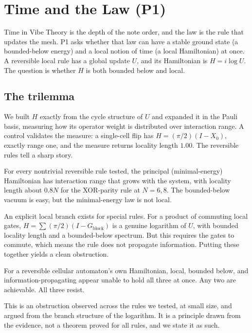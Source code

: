 \section{Time and the Law (P1)}
\label{sec:law}

Time in Vibe Theory is the depth of the note order, and the law is the rule that updates the mesh. P1 asks whether that law can have a stable ground state (a bounded-below energy) and a local notion of time (a local Hamiltonian) at once. A reversible local rule has a global update $U$, and its Hamiltonian is $H = i \log U$. The question is whether $H$ is both bounded below and local.

\subsection{The trilemma}

We built $H$ exactly from the cycle structure of $U$ and expanded it in the Pauli basis, measuring how its operator weight is distributed over interaction range. A control validates the measure: a single-cell flip has $H = (\pi/2)(I - X_0)$, exactly range one, and the measure returns locality length $1.00$. The reversible rules tell a sharp story.

\begin{result}
For every nontrivial reversible rule tested, the principal (minimal-energy) Hamiltonian has interaction range that grows with the system, with locality length about $0.8N$ for the XOR-parity rule at $N = 6, 8$. The bounded-below vacuum is easy, but the minimal-energy law is not local.
\end{result}

An explicit local branch exists for special rules. For a product of commuting local gates, $H = \sum (\pi/2)(I - G_{\text{block}})$ is a genuine logarithm of $U$, with bounded locality length and a bounded-below spectrum. But this requires the gates to commute, which means the rule does not propagate information. Putting these together yields a clean obstruction.

\begin{principle}
For a reversible cellular automaton's own Hamiltonian, local, bounded below, and information-propagating appear unable to hold all three at once. Any two are achievable. All three resist.
\end{principle}

This is an obstruction observed across the rules we tested, at small size, and argued from the branch structure of the logarithm. It is a principle drawn from the evidence, not a theorem proved for all rules, and we state it as such.

